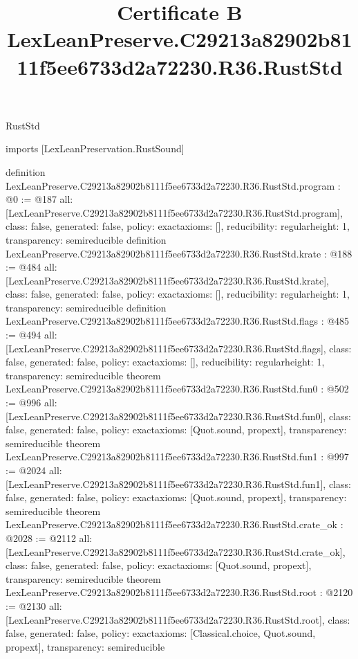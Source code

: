 \begin{lexlean}{RustStd}
\title{Certificate B LexLeanPreserve.C29213a82902b8111f5ee6733d2a72230.R36.RustStd}
\begin{coremodule}
imports [LexLeanPreservation.RustSound]

definition LexLeanPreserve.C29213a82902b8111f5ee6733d2a72230.R36.RustStd.program : @0 := @187 {
  all: [LexLeanPreserve.C29213a82902b8111f5ee6733d2a72230.R36.RustStd.program],
  class: false,
  generated: false,
  policy: exact{axioms: []},
  reducibility: regular{height: 1},
  transparency: semireducible
}
definition LexLeanPreserve.C29213a82902b8111f5ee6733d2a72230.R36.RustStd.krate : @188 := @484 {
  all: [LexLeanPreserve.C29213a82902b8111f5ee6733d2a72230.R36.RustStd.krate],
  class: false,
  generated: false,
  policy: exact{axioms: []},
  reducibility: regular{height: 1},
  transparency: semireducible
}
definition LexLeanPreserve.C29213a82902b8111f5ee6733d2a72230.R36.RustStd.flags : @485 := @494 {
  all: [LexLeanPreserve.C29213a82902b8111f5ee6733d2a72230.R36.RustStd.flags],
  class: false,
  generated: false,
  policy: exact{axioms: []},
  reducibility: regular{height: 1},
  transparency: semireducible
}
theorem LexLeanPreserve.C29213a82902b8111f5ee6733d2a72230.R36.RustStd.fun0 : @502 := @996 {
  all: [LexLeanPreserve.C29213a82902b8111f5ee6733d2a72230.R36.RustStd.fun0],
  class: false,
  generated: false,
  policy: exact{axioms: [Quot.sound, propext]},
  transparency: semireducible
}
theorem LexLeanPreserve.C29213a82902b8111f5ee6733d2a72230.R36.RustStd.fun1 : @997 := @2024 {
  all: [LexLeanPreserve.C29213a82902b8111f5ee6733d2a72230.R36.RustStd.fun1],
  class: false,
  generated: false,
  policy: exact{axioms: [Quot.sound, propext]},
  transparency: semireducible
}
theorem LexLeanPreserve.C29213a82902b8111f5ee6733d2a72230.R36.RustStd.crate_ok : @2028 := @2112 {
  all: [LexLeanPreserve.C29213a82902b8111f5ee6733d2a72230.R36.RustStd.crate_ok],
  class: false,
  generated: false,
  policy: exact{axioms: [Quot.sound, propext]},
  transparency: semireducible
}
theorem LexLeanPreserve.C29213a82902b8111f5ee6733d2a72230.R36.RustStd.root : @2120 := @2130 {
  all: [LexLeanPreserve.C29213a82902b8111f5ee6733d2a72230.R36.RustStd.root],
  class: false,
  generated: false,
  policy: exact{axioms: [Classical.choice, Quot.sound, propext]},
  transparency: semireducible
}


\end{coremodule}
\end{lexlean}
